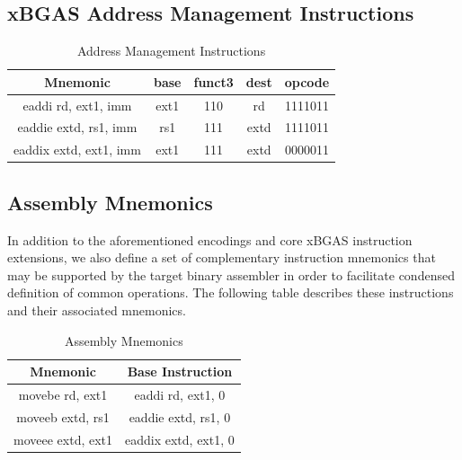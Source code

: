 \documentclass{article}
\begin{document}
\newpage
\subsection{xBGAS Address Management Instructions}

\begin{center}
\begin{small}

\begin{table}[H]
\caption{Address Management Instructions}
\begin{center}
\begin{tabular}{| c | c | c | c | c | }
\hline
Mnemonic & base & funct3 & dest & opcode \\ \hline
\hline
eaddi rd, ext1, imm & ext1 & 110 & rd & 1111011\\
\hline
eaddie extd, rs1, imm & rs1 &111 & extd & 1111011\\
\hline
eaddix extd, ext1, imm & ext1 & 111 & extd & 0000011\\
\hline
\end{tabular}
\end{center}
\end{table}

\end{small}
\end{center}

\subsection{Assembly Mnemonics}

In addition to the aforementioned encodings and core xBGAS 
instruction extensions, we also define a set of complementary 
instruction mnemonics that may be supported by the target 
binary assembler in order to facilitate condensed definition 
of common operations.  The following table describes 
these instructions and their associated mnemonics.  

\begin{center}
\begin{small}

\begin{table}[H]
\caption{Assembly Mnemonics}
\begin{center}
\begin{tabular}{| c | c |}
\hline
Mnemonic & Base Instruction\\ \hline
\hline
movebe rd, ext1 & eaddi rd, ext1, 0\\
\hline
moveeb extd, rs1 & eaddie extd, rs1, 0\\
\hline
moveee extd, ext1 & eaddix extd, ext1, 0\\
\hline
\end{tabular}
\end{center}
\end{table}

\end{small}
\end{center}
\end{document}
